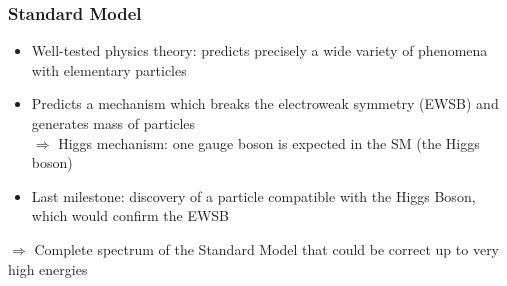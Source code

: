 \documentclass{beamer}
\begin{document}

   \begin{frame}
     \frametitle{Standard Model}

        \begin{itemize}
          \item Well-tested physics theory: predicts precisely a wide variety of phenomena with elementary particles
          \item Predicts a mechanism which breaks the electroweak symmetry (EWSB) and generates mass of particles \\
          $\Rightarrow$ Higgs mechanism: one gauge boson is expected in the SM (the Higgs boson)
          \item Last milestone: discovery of a particle compatible with the Higgs Boson, which would confirm the EWSB
        \end{itemize}
      
      \begin{center}
        $\Rightarrow$ Complete spectrum of the Standard Model that could be correct up to very high energies
      \end{center}

   \end{frame} 
    
\end{document}
